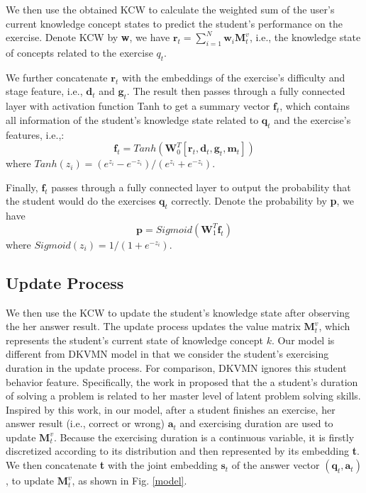 \documentclass{edm_template}
\begin{document}
We then use the obtained KCW to calculate the weighted sum of the user's current knowledge concept states to predict the student's performance on the exercise. Denote KCW by \textbf{w}, we have
$\textbf{r}_t = \sum_{i=1}^N\textbf{w}_i\textbf{M}_t^v$, i.e., the knowledge state of concepts related to the exercise \textbf{$q_t$}.

We further concatenate $\textbf{r}_t$ with the embeddings of the exercise's difficulty and stage feature, i.e., $\textbf{d}_t$ and $\textbf{g}_t$. The result then passes through a fully connected layer with activation function Tanh to get a summary vector $\textbf{f}_t$, which contains all information of the student's knowledge state related to $\textbf{q}_t$ and the exercise's features, i.e.,:
\begin{displaymath}
\textbf{f}_t = Tanh(\textbf{W}_0^T[\textbf{r}_t, \textbf{d}_t, \textbf{g}_t, \textbf{m}_t])
\end{displaymath}
where $Tanh(z_i) = (e^{z_i}-e^{-z_i})/(e^{z_i}+e^{-z_i}).$

Finally, $\textbf{f}_t$ passes through a fully connected layer to output the probability that the student would do the exercises $\textbf{q}_t$ correctly. Denote the probability by \textbf{p}, we have
\begin{displaymath}
\textbf{p} = Sigmoid(\textbf{W}_1^T\textbf{f}_t)
\end{displaymath}
where $Sigmoid(z_i) = 1/(1 + e^{-z_i}).$

\subsection{Update Process}

We then use the KCW to update the student's knowledge state after observing the her answer result. The update process updates the value matrix $\textbf{M}_t^v$, which represents the student's current state of knowledge concept $k$. Our model is different from DKVMN model in that we consider the student's exercising duration in the update process. For comparison, DKVMN ignores this student behavior feature. Specifically, the work in \cite{time} proposed that the a student's duration of solving a problem is related to her master level of latent problem solving skills. Inspired by this work, in our model, after a student finishes an exercise, her answer result (i.e., correct or wrong) $\textbf{a}_t$ and exercising duration are used to update $\textbf{M}_t^v$. Because the exercising duration is a continuous variable, it is firstly discretized according to its distribution and then represented by its embedding \textbf{t}. We then concatenate \textbf{t} with the joint embedding $\textbf{s}_t$ of the answer vector $(\textbf{q}_t,\textbf{a}_t)$, to update $\textbf{M}_t^v$, as shown in Fig. \ref{model}.
\end{document}
